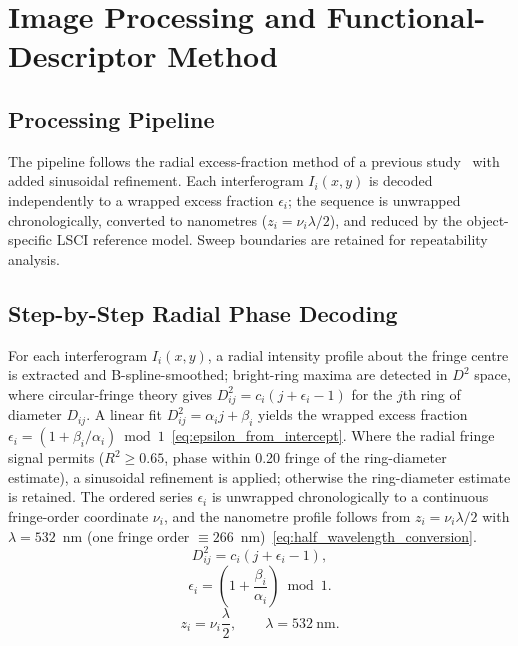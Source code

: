 \documentclass[review]{elsarticle}
\begin{document}
\section{Image Processing and Functional-Descriptor Method}

\subsection{Processing Pipeline}
The pipeline follows the radial excess-fraction method of a previous study~\cite{kucharski2025radial-0ca} with added sinusoidal refinement. Each interferogram $I_i(x,y)$ is decoded independently to a wrapped excess fraction $\epsilon_i$; the sequence is unwrapped chronologically, converted to nanometres ($z_i = \nu_i\lambda/2$), and reduced by the object-specific LSCI reference model. Sweep boundaries are retained for repeatability analysis.

\subsection{Step-by-Step Radial Phase Decoding}
For each interferogram $I_i(x,y)$, a radial intensity profile about the fringe centre is extracted and B-spline-smoothed; bright-ring maxima are detected in $D^2$ space, where circular-fringe theory gives $D_{ij}^{2}=c_i(j+\epsilon_i-1)$ for the $j$th ring of diameter $D_{ij}$. A linear fit $D_{ij}^{2}=\alpha_i j+\beta_i$ yields the wrapped excess fraction $\epsilon_i=(1+\beta_i/\alpha_i)\bmod 1$~\eqref{eq:epsilon_from_intercept}. Where the radial fringe signal permits ($R^2\geq0.65$, phase within 0.20 fringe of the ring-diameter estimate), a sinusoidal refinement is applied; otherwise the ring-diameter estimate is retained. The ordered series $\epsilon_i$ is unwrapped chronologically to a continuous fringe-order coordinate $\nu_i$, and the nanometre profile follows from $z_i=\nu_i\lambda/2$ with $\lambda=532$~nm (one fringe order $\equiv 266$~nm)~\eqref{eq:half_wavelength_conversion}.
\begin{equation}
D_{ij}^{2}=c_i(j+\epsilon_i-1),
\label{eq:ring_diameter_relation}
\end{equation}
\begin{equation}
\epsilon_i=\left(1+\frac{\beta_i}{\alpha_i}\right)\bmod 1.
\label{eq:epsilon_from_intercept}
\end{equation}
\begin{equation}
z_i=\nu_i\frac{\lambda}{2}, \qquad \lambda=532~\mathrm{nm}.
\label{eq:half_wavelength_conversion}
\end{equation}
\end{document}
